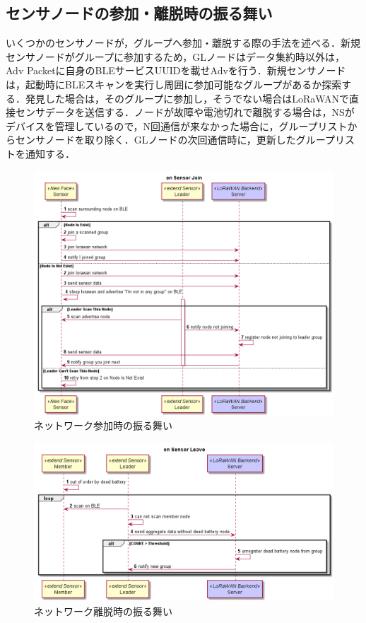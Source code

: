 \subsection{センサノードの参加・離脱時の振る舞い}
いくつかのセンサノードが，グループへ参加・離脱する際の手法を述べる．新規センサノードがグループに参加するため，GLノードはデータ集約時以外は，Adv Packetに自身のBLEサービスUUIDを載せAdvを行う．新規センサノードは，起動時にBLEスキャンを実行し周囲に参加可能なグループがあるか探索する．発見した場合は，そのグループに参加し，そうでない場合はLoRaWANで直接センサデータを送信する．ノードが故障や電池切れで離脱する場合は，NSがデバイスを管理しているので，N回通信が来なかった場合に，グループリストからセンサノードを取り除く．GLノードの次回通信時に，更新したグループリストを通知する．


\begin{figure}[]
    \begin{center}
    \includegraphics[width=14cm]{figures/グループ化_ネットワーク参加時.png}
    \caption{ネットワーク参加時の振る舞い}
    \label{fig:group_on_join}
    \end{center}
\end{figure}


\begin{figure}[]
    \begin{center}
    \includegraphics[width=14cm]{figures/グループ化_ネットワーク離脱時.png}
    \caption{ネットワーク離脱時の振る舞い}
    \label{fig:group_on_leave}
    \end{center}
\end{figure}